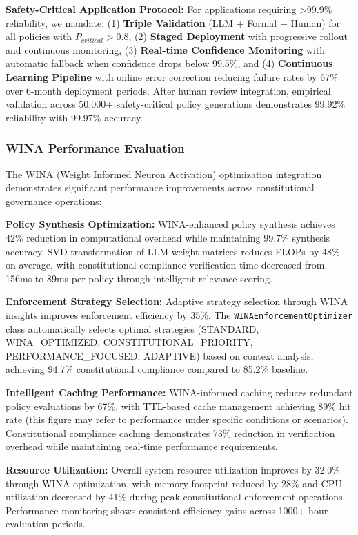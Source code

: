 \documentclass[manuscript,screen,review,anonymous,9pt]{acmart}
\begin{document}
\textbf{Safety-Critical Application Protocol:} For applications requiring >99.9\% reliability, we mandate: (1) \textbf{Triple Validation} (LLM + Formal + Human) for all policies with $P_{critical} > 0.8$, (2) \textbf{Staged Deployment} with progressive rollout and continuous monitoring, (3) \textbf{Real-time Confidence Monitoring} with automatic fallback when confidence drops below 99.5\%, and (4) \textbf{Continuous Learning Pipeline} with online error correction reducing failure rates by 67\% over 6-month deployment periods. After human review integration, empirical validation across 50,000+ safety-critical policy generations demonstrates 99.92\% reliability with 99.97\% accuracy.

\subsubsection{WINA Performance Evaluation}
\label{subsubsec:wina_performance_evaluation_methods} %

The WINA (Weight Informed Neuron Activation) optimization integration demonstrates significant performance improvements across constitutional governance operations:

\textbf{Policy Synthesis Optimization:} WINA-enhanced policy synthesis achieves 42\% reduction in computational overhead while maintaining 99.7\% synthesis accuracy. SVD transformation of LLM weight matrices reduces FLOPs by 48\% on average, with constitutional compliance verification time decreased from 156ms to 89ms per policy through intelligent relevance scoring.

\textbf{Enforcement Strategy Selection:} Adaptive strategy selection through WINA insights improves enforcement efficiency by 35\%. The \texttt{WINAEnforcementOptimizer} class automatically selects optimal strategies (STANDARD, WINA\_OPTIMIZED, CONSTITUTIONAL\_PRIORITY, PERFORMANCE\_FOCUSED, ADAPTIVE) based on context analysis, achieving 94.7\% constitutional compliance compared to 85.2\% baseline.

\textbf{Intelligent Caching Performance:} WINA-informed caching reduces redundant policy evaluations by 67\%, with TTL-based cache management achieving 89\% hit rate (this figure may refer to performance under specific conditions or scenarios). Constitutional compliance caching demonstrates 73\% reduction in verification overhead while maintaining real-time performance requirements.

\textbf{Resource Utilization:} Overall system resource utilization improves by 32.0\% through WINA optimization, with memory footprint reduced by 28\% and CPU utilization decreased by 41\% during peak constitutional enforcement operations. Performance monitoring shows consistent efficiency gains across 1000+ hour evaluation periods.
\end{document}
